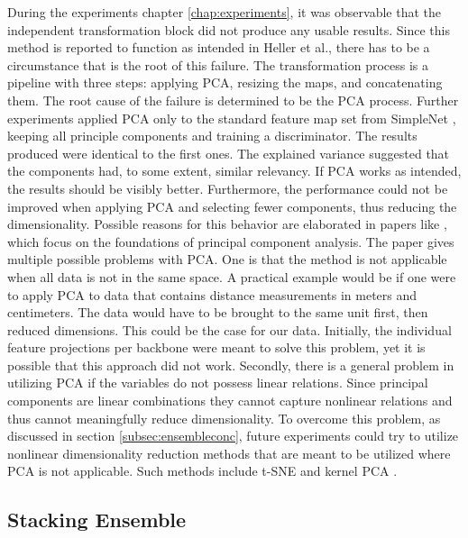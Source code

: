 During the experiments chapter \ref{chap:experiments}, it was observable that the independent transformation block \cite{EnsembleHeller2023} did not produce any usable results. 
Since this method is reported to function as intended in Heller et al., there has to be a circumstance that is the root of this failure. The transformation process is a 
pipeline with three steps: applying PCA, resizing the maps, and concatenating them. \newline
The root cause of the failure is determined to be the PCA process. Further experiments applied PCA only to the standard feature map set from SimpleNet \cite{liu2023simplenet}, 
keeping all principle components and training 
a discriminator. The results produced were identical to the first ones. The explained variance suggested that the components had, to some extent, similar relevancy. If PCA 
works as intended, the results should be visibly better. Furthermore, the performance could not be improved when applying PCA and selecting fewer components, thus reducing 
the dimensionality. Possible reasons for this behavior are elaborated in papers like \cite{Jolliffe_2016PCAbasics}, which focus on the foundations of principal component analysis. 
The paper gives multiple possible problems with PCA. One is that the method is not applicable when all data is not in the same space. A practical example would be if one were to 
apply PCA to data that contains distance measurements in meters and centimeters. The data would have to be brought to the same unit first, then reduced dimensions. This could 
be the case for our data. Initially, the individual feature projections per backbone were meant to solve this problem, yet it is possible that this approach did not work. 
Secondly, there is a general problem in utilizing PCA if the variables do not possess linear relations. Since principal components are linear combinations \cite{Jolliffe_2016PCAbasics} 
they cannot capture nonlinear relations and thus cannot meaningfully reduce dimensionality. To overcome this problem, as discussed in section \ref{subsec:ensembleconc}, 
future experiments could try to utilize nonlinear dimensionality reduction methods that are meant to be utilized where PCA is not applicable. Such methods include t-SNE \cite{tSNE} 
and kernel PCA \cite{Hoffmann_2007kernelPCA}.



\subsection{Stacking Ensemble}
\label{subsec:stackingdiscussion}

